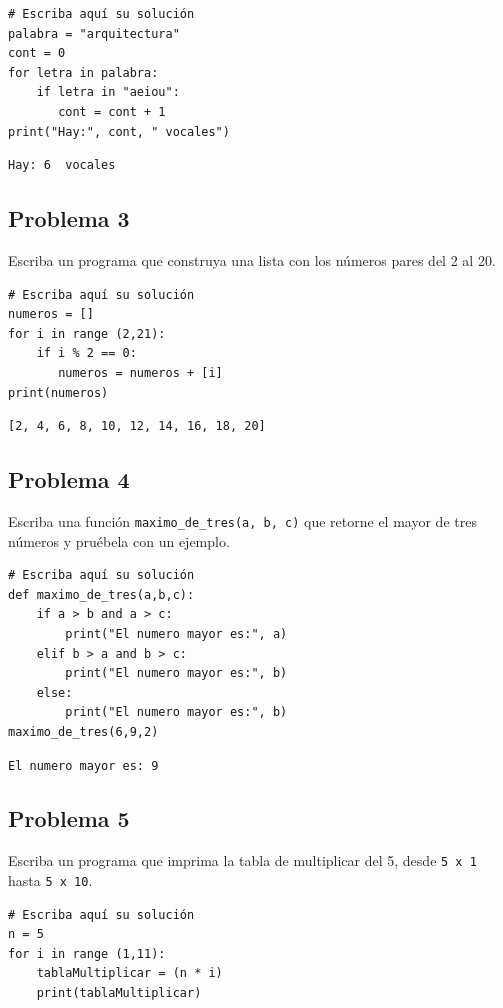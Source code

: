 \documentclass{article}
\begin{document}
\begin{verbatim}
# Escriba aquí su solución
palabra = "arquitectura"
cont = 0
for letra in palabra:
    if letra in "aeiou":
       cont = cont + 1
print("Hay:", cont, " vocales")
\end{verbatim}

\begin{verbatim}
Hay: 6  vocales
\end{verbatim}

\subsection{Problema 3}
\label{sec:orgc17b838}
Escriba un programa que construya una lista con los números pares del 2 al 20.

\begin{verbatim}
# Escriba aquí su solución
numeros = []
for i in range (2,21):
    if i % 2 == 0:
       numeros = numeros + [i]
print(numeros)
\end{verbatim}

\begin{verbatim}
[2, 4, 6, 8, 10, 12, 14, 16, 18, 20]
\end{verbatim}

\subsection{Problema 4}
\label{sec:orgb785dd5}
Escriba una función \texttt{maximo\_de\_tres(a, b, c)} que retorne el mayor de tres números y pruébela con un ejemplo.

\begin{verbatim}
# Escriba aquí su solución
def maximo_de_tres(a,b,c):
    if a > b and a > c:
        print("El numero mayor es:", a)
    elif b > a and b > c:
        print("El numero mayor es:", b)
    else:
        print("El numero mayor es:", b)
maximo_de_tres(6,9,2)
\end{verbatim}

\begin{verbatim}
El numero mayor es: 9
\end{verbatim}

\subsection{Problema 5}
\label{sec:org053c3c7}
Escriba un programa que imprima la tabla de multiplicar del 5, desde \texttt{5 x 1} hasta \texttt{5 x 10}.

\begin{verbatim}
# Escriba aquí su solución
n = 5
for i in range (1,11):
    tablaMultiplicar = (n * i)
    print(tablaMultiplicar)
\end{verbatim}
\end{document}
